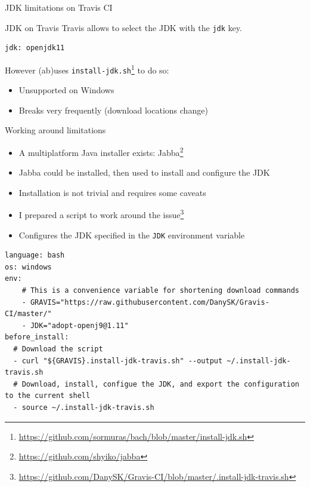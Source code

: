 \documentclass[presentation]{beamer}
\begin{document}
\begin{frame}[fragile]{JDK limitations on Travis CI}
    \begin{block}{JDK on Travis}
        Travis allows to select the JDK with the \texttt{jdk} key.
        \begin{verbatim}
jdk: openjdk11
        \end{verbatim}
        However (ab)uses \texttt{install-jdk.sh}\footnote{\url{https://github.com/sormuras/bach/blob/master/install-jdk.sh}} to do so:
        \begin{itemize}
            \item Unsupported on Windows
            \item Breaks very frequently (download locations change)
        \end{itemize}
    \end{block}
\end{frame}

\begin{frame}[fragile]{Working around limitations}
    \begin{itemize}
        \item A multiplatform Java installer exists: Jabba\footnote{\scriptsize\url{https://github.com/shyiko/jabba}}
        \item Jabba could be installed, then used to install and configure the JDK
        \item Installation is not trivial and requires some caveats
        \item I prepared a script to work around the issue\footnote{\scriptsize\url{https://github.com/DanySK/Gravis-CI/blob/master/.install-jdk-travis.sh}}
        \item Configures the JDK specified in the \texttt{JDK} environment variable
    \end{itemize}
    \begin{block}{}
        \begin{verbatim}
language: bash
os: windows
env:
    # This is a convenience variable for shortening download commands
    - GRAVIS="https://raw.githubusercontent.com/DanySK/Gravis-CI/master/"
    - JDK="adopt-openj9@1.11"
before_install:
  # Download the script
  - curl "${GRAVIS}.install-jdk-travis.sh" --output ~/.install-jdk-travis.sh
  # Download, install, configue the JDK, and export the configuration to the current shell
  - source ~/.install-jdk-travis.sh
        \end{verbatim}
    \end{block}
\end{frame}
\end{document}
